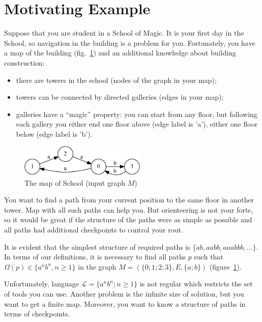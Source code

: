 \section{Motivating Example}\label{motivExample}

Suppose that you are student in a School of Magic.
It is your first day in the School, so navigation in the building is a problem for you.
Fortunately, you have a map of the building (fig.~\ref{input}) and an additional knowledge about building construction:
\begin{itemize}
  \item there are towers in the school (nodes of the graph in your map);
  \item towers can be connected by directed galleries (edges in your map);
  \item galleries have a ``magic'' property: you can start from any floor, but following each gallery you either end one floor above (edge label is 'a'), either one floor below (edge label is 'b'). 
\end{itemize}

\begin{figure}[h]
    \begin{center}
        \includegraphics[width=6cm]{dot/input.pdf}
        \caption{The map of School (input graph $M$)}
        \label{input}        
    \end{center}
\end{figure}


You want to find a path from your current position to the same floor in another tower. 
Map with all such paths can help you.
But orienteering is not your forte, so it would be great if the structure of the paths were as simple as possible and all paths had additional checkpoints to control your rout.

It is evident that the simplest structure of required paths is $\{ab, aabb, aaabbb, \dots\}$.
In terms of our definitions, it is necessary to find all paths $p$ such that $\Omega(p) \in \{a^n b^n, n \geq 1\}$ in the graph $M=(\{0;1;2;3\},E,\{a;b\})$ (figure~\ref{input}).

Unfortunately, language $\mathcal{L} = \{a^n b^n; n \geq 1\}$ is not regular which restricts the set of tools you can use. 
Another problem is the infinite size of solution, but you want to get a finite map.  
Moreover, you want to know a structure of paths in terms of checkpoints.

